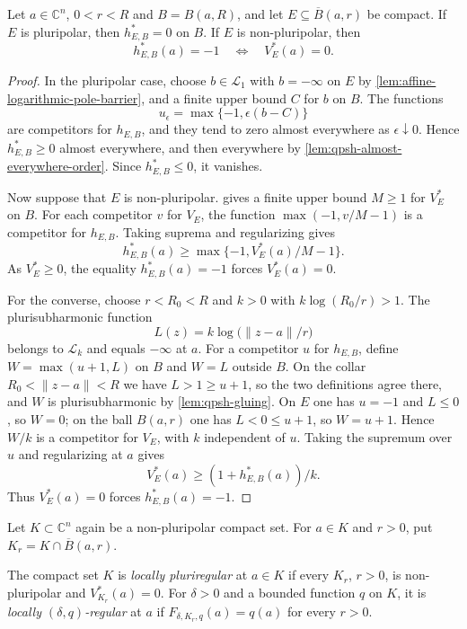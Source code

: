 \begin{lemma}\label{lem:relative-affine-zero-value}
Let $a\in\mathbb C^n$, $0<r<R$ and $B=B(a,R)$, and let $E\subseteq\overline B(a,r)$ be compact. If $E$ is pluripolar, then $h_{E,B}^*=0$ on $B$. If $E$ is non-pluripolar, then
\[
 h_{E,B}^*(a)=-1\quad\Longleftrightarrow\quad V_E^*(a)=0.
\]
\end{lemma}
\begin{proof}
In the pluripolar case, choose $b\in\mathcal L_1$ with $b=-\infty$ on $E$ by \cref{lem:affine-logarithmic-pole-barrier}, and a finite upper bound $C$ for $b$ on $B$. The functions
\[
 u_\epsilon=\max\{-1,\epsilon(b-C)\}
\]
are competitors for $h_{E,B}$, and they tend to zero almost everywhere as $\epsilon\downarrow0$. Hence $h_{E,B}^*\geq0$ almost everywhere, and then everywhere by \cref{lem:qpsh-almost-everywhere-order}. Since $h_{E,B}^*\leq0$, it vanishes.

Now suppose that $E$ is non-pluripolar.  gives a finite upper bound $M\geq1$ for $V_E^*$ on $B$. For each competitor $v$ for $V_E$, the function $\max(-1,v/M-1)$ is a competitor for $h_{E,B}$. Taking suprema and regularizing gives
\[
 h_{E,B}^*(a)\geq\max\{-1,V_E^*(a)/M-1\}.
\]
As $V_E^*\geq0$, the equality $h_{E,B}^*(a)=-1$ forces $V_E^*(a)=0$.

For the converse, choose $r<R_0<R$ and $k>0$ with $k\log(R_0/r)>1$. The plurisubharmonic function
\[
 L(z)=k\log\bigl(\lVert z-a\rVert/r\bigr)
\]
belongs to $\mathcal L_k$ and equals $-\infty$ at $a$. For a competitor $u$ for $h_{E,B}$, define $W=\max(u+1,L)$ on $B$ and $W=L$ outside $B$. On the collar $R_0<\lVert z-a\rVert<R$ we have $L>1\geq u+1$, so the two definitions agree there, and $W$ is plurisubharmonic by \cref{lem:qpsh-gluing}. On $E$ one has $u=-1$ and $L\leq0$, so $W=0$; on the ball $B(a,r)$ one has $L<0\leq u+1$, so $W=u+1$. Hence $W/k$ is a competitor for $V_E$, with $k$ independent of $u$. Taking the supremum over $u$ and regularizing at $a$ gives
\[
 V_E^*(a)\geq(1+h_{E,B}^*(a))/k.
\]
Thus $V_E^*(a)=0$ forces $h_{E,B}^*(a)=-1$.
\end{proof}

Let $K\subset\mathbb C^n$ again be a non-pluripolar compact set. For $a\in K$ and $r>0$, put $K_r=K\cap\overline B(a,r)$.

\begin{definition}\label{def:affine-local-pluriregularity}
The compact set $K$ is \emph{locally pluriregular} at $a\in K$ if every $K_r$, $r>0$, is non-pluripolar and $V_{K_r}^*(a)=0$. For $\delta>0$ and a bounded function $q$ on $K$, it is \emph{locally $(\delta,q)$-regular} at $a$ if $F_{\delta,K_r,q}(a)=q(a)$ for every $r>0$.
\end{definition}

